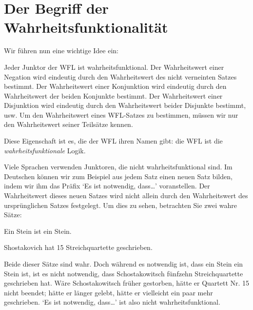 \section{Der Begriff der Wahrheitsfunktionalität}
Wir führen nun eine wichtige Idee ein: 
 
Jeder Junktor der WFL ist wahrheitsfunktional. Der Wahrheitswert einer Negation wird eindeutig durch den Wahrheitswert des nicht verneinten Satzes bestimmt. Der Wahrheitswert einer Konjunktion wird eindeutig durch den Wahrheitswert der beiden Konjunkte bestimmt. Der Wahrheitswert einer Disjunktion wird eindeutig durch den Wahrheitswert beider Disjunkte bestimmt, usw. Um den Wahrheitswert eines WFL-Satzes zu bestimmen, müssen wir nur den Wahrheitswert seiner Teilsätze kennen. 

Diese Eigenschaft ist es, die der WFL ihren Namen gibt: die WFL ist die \emph{wahrheitsfunktionale} Logik.

Viele Sprachen verwenden Junktoren, die nicht wahrheitsfunktional sind. Im Deutschen können wir zum Beispiel aus jedem Satz einen neuen Satz bilden, indem wir ihm das Präfix `Es ist notwendig, dass\dots' voranstellen. Der Wahrheitswert dieses neuen Satzes wird nicht allein durch den Wahrheitswert des ursprünglichen Satzes festgelegt. Um dies zu sehen, betrachten Sie zwei wahre Sätze: 
	\begin{earg}
		\item Ein Stein ist ein Stein.
		\item Shostakovich hat 15 Streichquartette geschrieben.
	\end{earg}
Beide dieser Sätze sind wahr. Doch während es notwendig ist, dass ein Stein ein Stein ist, ist es nicht notwendig, dass Schostakowitsch fünfzehn Streichquartette geschrieben hat. Wäre Schostakowitsch früher gestorben, hätte er Quartett Nr. 15 nicht beendet; hätte er länger gelebt, hätte er vielleicht ein paar mehr geschrieben. `Es ist notwendig, dass\dots' ist also nicht wahrheitsfunktional. 

